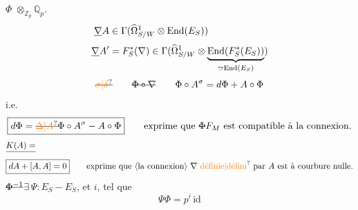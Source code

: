 $\Phi$  $\otimes_{\mathbb Z_p}\mathbb Q_p$.
\[
\begin{aligned}
\deleted{\nabla}A&\in\Gamma(\widehat\Omega^1_{S/W}\otimes\operatorname{End}(E_S))\\
\deleted{\nabla}A'&=F_S^*(\nabla)\in\Gamma(\widehat\Omega^1_{S/W}\otimes\underbrace{\operatorname{End}(F_S^*(E_S))}_{\simeq\operatorname{End}(E_S)})
\end{aligned}
\]
\[
\deleted{\unsure{\sigma|\delta}}\qquad\deleted{\Phi\circ\nabla}\qquad \Phi\circ A^\sigma=d\Phi+A\circ\Phi
\]
i.e.
\[
\boxed{d\Phi=\deleted{\unsure{\Delta|A}}\Phi\circ A^\sigma-A\circ\Phi}\qquad
\text{exprime que $\deleted{\Phi}F_M$ est compatible à la connexion.}
\]
\[
\begin{aligned}
&\deleted{K(A)=}\\
&\boxed{dA+[A,A]=0}\qquad\text{exprime que \inserted{la connexion} $\nabla$ \unsure{définie|défini} par $A$ est à courbure nulle.}
\end{aligned}
\]
$\deleted{\Phi^{-1}}$\quad $\exists\,\Psi:E_S\mathbin{-}E_S$, et $i$, tel que
\[
\boxed{\Psi\Phi=p^i\,\mathrm{id}}
\]
